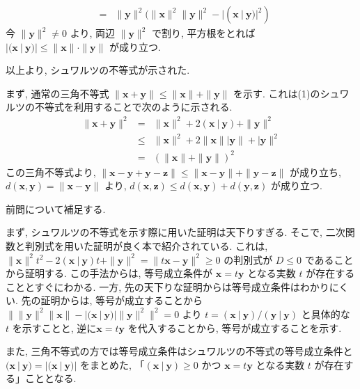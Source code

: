 \documentclass[dvipdfmx,a4j]{jarticle}
\newcounter{pn}     %
\let\np\newpage
\renewcommand{\newpage}{
    \np
    \addtocounter{pn}{1}
}
\begin{document}
{\begin{enumerate}
\begin{eqnarray*}
        &=& \|\bm{y}\|^2(\|\bm{x}\|^2\|\bm{y}\|^2 - |(\bm{x}\ |\ \bm{y})|^2)
    \end{eqnarray*}
    今 $\|\bm{y}\|^2 \neq 0$ より, 両辺 $\|\bm{y}\|^2$ で割り, 平方根をとれば $|(\bm{x}\ |\ \bm{y})| \leq \|\bm{x}\|\cdot \|\bm{y}\|$ が成り立つ.
\end{enumerate}
以上より, シュワルツの不等式が示された.
\item まず, 通常の三角不等式 $\|\bm{x} + \bm{y}\| \leq \|\bm{x}\| + \|\bm{y}\|$ を示す.
これは(1)のシュワルツの不等式を利用することで次のように示される.
\begin{eqnarray*}
    \|\bm{x} + \bm{y}\|^2 &=& \|\bm{x}\|^2 + 2(\bm{x}\ |\ \bm{y}) + \|\bm{y}\|^2\\
    &\leq& \|\bm{x}\|^2 + 2\|\bm{x}\||\bm{y}\| + |\bm{y}\|^2\\
    &=& (\|\bm{x}\| + \|\bm{y}\|)^2
\end{eqnarray*}
この三角不等式より, $\|\bm{x} - \bm{y} + \bm{y} - \bm{z}\| \leq \|\bm{x} -\bm{y}\| + \|\bm{y} - \bm{z}\|$ が成り立ち, $d(\bm{x}, \bm{y}) = \|\bm{x} - \bm{y}\|$ より, 
$d(\bm{x}, \bm{z}) \leq d(\bm{x}, \bm{y}) + d(\bm{y}, \bm{z})$ が成り立つ.
}
\newpage
前問について補足する.

まず, シュワルツの不等式を示す際に用いた証明は天下りすぎる. そこで, 二次関数と判別式を用いた証明が良く本で紹介されている.
これは, $\|\bm{x}\|^2t^2 - 2(\bm{x}\ |\ \bm{y})t + \|\bm{y}\|^2 = \| t\bm{x} - \bm{y}\|^2 \geq 0$ の判別式が $D \leq 0$ であることから証明する.
この手法からは, 等号成立条件が $\bm{x} = t\bm{y}$ となる実数 $t$ が存在することとすぐにわかる. 一方, 先の天下りな証明からは等号成立条件はわかりにくい.
先の証明からは, 等号が成立することから $\| \|\bm{y}\|^2\|\bm{x}\| - |(\bm{x}\ |\ \bm{y})| \|\bm{y}\|^2 \|^2 = 0$ より $t = (\bm{x}\ |\ \bm{y})/(\bm{y}\ |\ \bm{y})$ と具体的な $t$ を示すことと, 
逆に$\bm{x} = t\bm{y}$ を代入することから, 等号が成立することを示す. 

また, 三角不等式の方では等号成立条件はシュワルツの不等式の等号成立条件と $(\bm{x}\ |\ \bm{y}) = |(\bm{x}\ |\ \bm{y})|$ をまとめた, 
「$(\bm{x}\ |\ \bm{y}) \geq 0$ かつ $\bm{x} = t\bm{y}$ となる実数 $t$ が存在する」こととなる.
\end{document}
